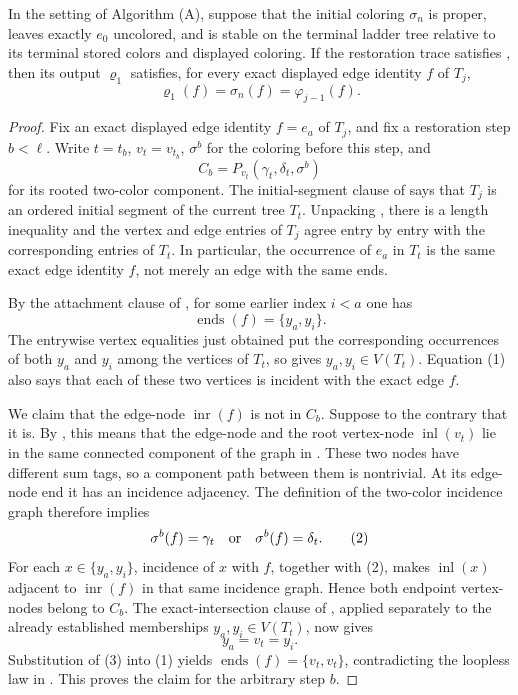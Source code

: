 \begin{lemma}
In the setting of Algorithm (A), suppose that the initial coloring
\(\sigma_n\) is proper, leaves exactly \(e_0\) uncolored, and is stable
on the terminal ladder tree relative to its terminal stored colors and
displayed coloring.  If the restoration trace satisfies
, then its output
\(\varrho_1\) satisfies, for every exact displayed edge identity \(f\)
of \(T_j\),
\[
             \varrho_1(f)=\sigma_n(f)=\varphi_{j-1}(f).
\]
\end{lemma}
\begin{proof}
Fix an exact displayed edge identity
\(f=e_a\) of \(T_j\), and fix a restoration step \(b<\ell\).  Write
\(t=t_b\), \(v_t=v_{t_b}\), \(\sigma^b\) for the coloring before this
step, and
\[
 C_b=P_{v_t}(\gamma_t,\delta_t,\sigma^b)
\]
for its rooted two-color component.  The initial-segment clause of
 says that \(T_j\) is an
ordered initial segment of the current tree \(T_t\).  Unpacking
, there is a length inequality and
the vertex and edge entries of \(T_j\) agree entry by entry with the
corresponding entries of \(T_t\).  In particular, the occurrence of
\(e_a\) in \(T_t\) is the same exact edge identity \(f\), not merely an
edge with the same ends.

By the attachment clause of , for some earlier
index \(i<a\) one has
\[
             \operatorname{ends}(f)=\{y_a,y_i\}.              \tag{1}
\]
The entrywise vertex equalities just obtained put the corresponding
occurrences of both \(y_a\) and \(y_i\) among the vertices of \(T_t\),
so  gives
\(y_a,y_i\in V(T_t)\).  Equation (1) also says that each of these two
vertices is incident with the exact edge \(f\).

We claim that the edge-node \(\operatorname{inr}(f)\) is not in
\(C_b\).  Suppose to the contrary that it is.  By
, this means that the edge-node and the root
vertex-node \(\operatorname{inl}(v_t)\) lie in the same connected
component of the graph in .  These two
nodes have different sum tags, so a component path between them is
nontrivial.  At its edge-node end it has an incidence adjacency.  The
definition of the two-color incidence graph therefore implies
\[
          \sigma^b(f)=\gamma_t\quad\hbox{or}\quad
          \sigma^b(f)=\delta_t.                              \tag{2}
\]
For each \(x\in\{y_a,y_i\}\), incidence of \(x\) with \(f\), together
with (2), makes \(\operatorname{inl}(x)\) adjacent to
\(\operatorname{inr}(f)\) in that same incidence graph.  Hence both
endpoint vertex-nodes belong to \(C_b\).  The exact-intersection clause
of , applied separately to
the already established memberships \(y_a,y_i\in V(T_t)\), now gives
\[
                         y_a=v_t=y_i.                         \tag{3}
\]
Substitution of (3) into (1) yields
\(\operatorname{ends}(f)=\{v_t,v_t\}\), contradicting the loopless
law in .  This proves the claim for the
arbitrary step \(b\).


\end{proof}
